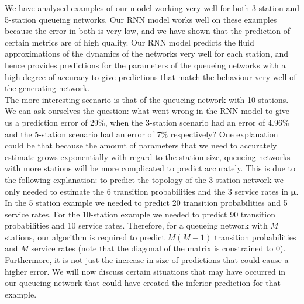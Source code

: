 \documentclass[a4paper,11pt,titlepage]{article}
\begin{document}
We have analysed examples of our model working very well for both 3-station and 5-station queueing networks. Our RNN model works well on these examples because the error in both is very low, and we have shown that the prediction of certain metrics are of high quality. Our RNN model predicts the fluid approximations of the dynamics of the networks very well for each station, and hence provides predictions for the parameters of the queueing networks with a high degree of accuracy to give predictions that match the behaviour very well of the generating network. \\

The more interesting scenario is that of the queueing network with 10 stations. We can ask ourselves the question: what went wrong in the RNN model to give us a prediction error of 29\%, when the 3-station scenario had an error of 4.96\% and the 5-station scenario had an error of 7\% respectively? One explanation could be that because the amount of parameters that we need to accurately estimate grows exponentially with regard to the station size, queueing networks with more stations will be more complicated to predict accurately. This is due to the following explanation: to predict the topology of the 3-station network we only needed to estimate the 6 transition probabilities and the 3 service rates in $\bm{\mu}$. In the 5 station example we needed to predict 20 transition probabilities and 5 service rates. For the 10-station example we needed to predict 90 transition probabilities and 10 service rates. Therefore, for a queueing network with $M$ stations, our algorithm is required to predict $M(M-1)$ transition probabilities and $M$ service rates (note that the diagonal of the matrix is constrained to 0). Furthermore, it is not just the increase in size of predictions that could cause a higher error. We will now discuss certain situations that may have occurred in our queueing network that could have created the inferior prediction for that example. \\
\end{document}
